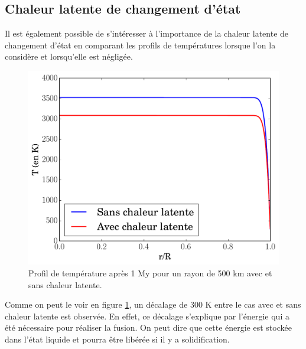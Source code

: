 \documentclass[10pt,a4paper]{article}
\numberwithin{equation}{section}
\begin{document}
\newpage
\subsection{Chaleur latente de changement d'état}
\label{latente}

Il est également possible de s'intéresser à l'importance de la chaleur latente de changement d'état en comparant les profils de températures lorsque l'on la considère et lorsqu'elle est négligée.

\begin{figure}[h]
    \centering	    
	\includegraphics[scale=0.5]{figures/diffusion1.pdf}
    \caption{Profil de température après 1 My pour un rayon de 500 km avec et sans chaleur latente.}
    	\label{diffusion1} 
\end{figure}
\medskip

Comme on peut le voir en figure \ref{diffusion1}, un décalage de 300 K entre le cas avec et sans chaleur latente est observée. En effet, ce décalage s'explique par l'énergie qui a été nécessaire pour réaliser la fusion. On peut dire que cette énergie est stockée dans l'état liquide et pourra être libérée si il y a solidification.
\end{document}
